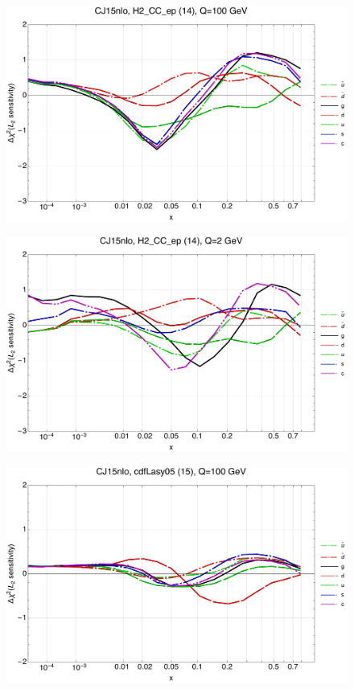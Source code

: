 \documentclass[10pt,aps,prd,floatfix,titlepage]{revtex4}
\begin{document}
\clearpage
\begin{figure}
\includegraphics[width=\textwidth,height=0.44\textheight,keepaspectratio]{1/14_CJ15nlo_L2_q100_Sf_1.pdf}
\caption{}
\end{figure}
\begin{figure}
\includegraphics[width=\textwidth,height=0.44\textheight,keepaspectratio]{1/14_CJ15nlo_L2_q2_Sf_1.pdf}
\caption{}
\end{figure}
\clearpage
\begin{figure}
\includegraphics[width=\textwidth,height=0.44\textheight,keepaspectratio]{1/15_CJ15nlo_L2_q100_Sf_1.pdf}
\caption{}
\end{figure}
\end{document}
